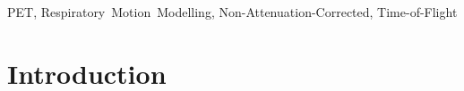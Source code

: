 \documentclass[9pt]{IEEEtran}
\begin{document}
% 



\maketitle

\begin{abstract}

\end{abstract}



\begin{IEEEkeywords}
PET, Respiratory~Motion~Modelling, Non-Attenuation-Corrected, Time-of-Flight
\end{IEEEkeywords}

\vspace{-0.2cm}

%
\IEEEpeerreviewmaketitle

\section{Introduction}
% 
% 
% 
% 
\end{document}
